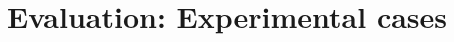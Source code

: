 \documentclass[10pt,aspectratio=169,dvipsnames]{beamer} %
\begin{document}
	\section*{Evaluation: Experimental cases}	
	\setcounter{subfigure}{0}		%
\end{document}
